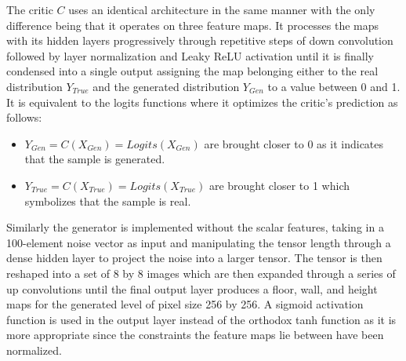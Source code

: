 \documentclass{Configuration_Files/PoliMi3i_thesis}
\begin{document}
The critic $C$ uses an identical architecture in the same manner with the only difference 
being that it operates on three feature maps. It processes the maps with its hidden 
layers progressively through repetitive steps of down convolution followed by layer 
normalization and Leaky ReLU activation until it is finally condensed into a single 
output assigning the map belonging either to the real distribution $Y_{True}$ and the generated 
distribution $Y_{Gen}$ to a value between 0 and 1. It is equivalent to the logits functions 
where it optimizes the critic’s prediction as follows:
\begin{itemize}
\item $Y_{Gen} = C(X_{Gen}) = Logits(X_{Gen})$ are brought closer to 0 as it indicates that the
sample is generated.
\item $Y_{True} = C(X_{True}) = Logits(X_{True})$ are brought closer to 1 which symbolizes that the 
sample is real. 
\end{itemize}

Similarly the generator is implemented without the scalar features, taking in a 100-element noise 
vector as input and manipulating the tensor length through a dense hidden 
layer to project the noise into a larger tensor. The tensor is then reshaped into a set of 
8 by 8 images which are then expanded through a series of up convolutions until the 
final output layer produces a floor, wall, and height maps for the generated level of 
pixel size 256 by 256. A sigmoid activation function is used in the output layer instead of 
the orthodox tanh function as it is more appropriate since the constraints the feature 
maps lie between have been normalized. 
\end{document}
